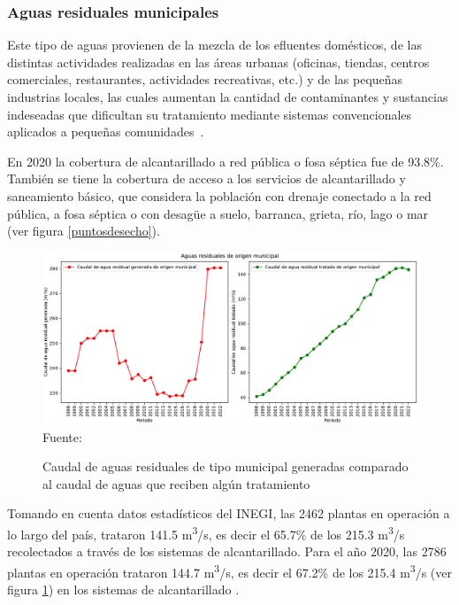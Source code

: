 \subsubsection{Aguas residuales municipales}
Este tipo de aguas provienen de la mezcla de los \glspl{efluente} domésticos, de las distintas actividades realizadas en las áreas urbanas (oficinas, tiendas, centros comerciales, restaurantes, actividades recreativas, etc.) y de las pequeñas industrias locales, las cuales aumentan la cantidad de contaminantes y sustancias indeseadas que dificultan su tratamiento mediante sistemas convencionales aplicados a pequeñas comunidades~\citep{lazcano2016}.\par
En 2020 la cobertura de alcantarillado a red pública o fosa séptica fue de 93.8\%. También se tiene la cobertura de acceso a los servicios de alcantarillado y saneamiento básico, que considera la población con drenaje conectado a la red pública, a fosa séptica o con desagüe a suelo, barranca, grieta, río, lago o mar (ver figura \ref{puntosdesecho}).
\begin{figure}[H]
	\centering
	\includegraphics[scale=0.45]{../Images/AR_municipal_svg-tex.pdf}
	\\\small{Fuente: \cite{ODS23}}
	\caption{Caudal de aguas residuales de tipo municipal generadas comparado al caudal de aguas que reciben algún tratamiento}\label{aguamun}
\end{figure}
Tomando en cuenta datos estadísticos del \acrshort{INEGI}, las 2462 plantas en operación a lo largo del país, trataron 141.5 m\textsuperscript{3}/s, es decir el 65.7\% de los 215.3 m\textsuperscript{3}/s recolectados a través de los sistemas de alcantarillado. Para el año 2020, las 2786 plantas en operación trataron 144.7 m\textsuperscript{3}/s, es decir el 67.2\% de los 215.4 m\textsuperscript{3}/s (ver figura \ref{aguamun}) en los sistemas de alcantarillado \citep{EAM}.
